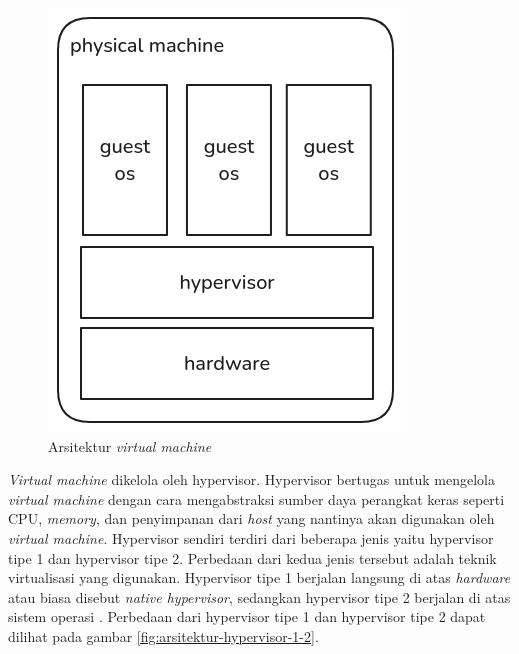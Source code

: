 \begin{figure}[H]
  \centering

  \includegraphics[scale=0.6]{gambar/virtual-machine-architecture.png}

  \caption{Arsitektur \emph{virtual machine}}
  \label{fig:arsitektur-virtual-machine}
\end{figure}

\emph{Virtual machine} dikelola oleh hypervisor. Hypervisor bertugas untuk
mengelola \emph{virtual machine} dengan cara mengabstraksi sumber daya perangkat keras
seperti CPU, \emph{memory}, dan penyimpanan dari \emph{host} yang nantinya akan digunakan
oleh \emph{virtual machine}. Hypervisor sendiri terdiri dari beberapa jenis yaitu hypervisor tipe 1
dan hypervisor tipe 2. Perbedaan dari kedua jenis tersebut adalah teknik virtualisasi yang digunakan.
Hypervisor tipe 1 berjalan langsung di atas \emph{hardware} atau biasa disebut \emph{native hypervisor},
sedangkan hypervisor tipe 2 berjalan di atas sistem operasi \parencite{Aalam_2021}. Perbedaan
dari hypervisor tipe 1 dan hypervisor tipe 2 dapat dilihat pada gambar \ref{fig:arsitektur-hypervisor-1-2}.

